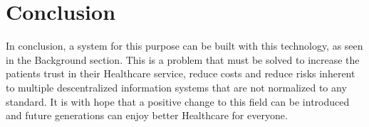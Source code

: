 \documentclass[notitlepage]{llncs}
\begin{document}

\section{Conclusion}
In conclusion, a system for this purpose can be built with this technology, as seen in the Background section. This is a problem that must be solved to increase the patients trust in their Healthcare service, reduce costs and reduce risks inherent to multiple descentralized information systems that are not normalized to any standard. It is with hope that a positive change to this field can be introduced and future generations can enjoy better Healthcare for everyone.
\newpage


\begingroup
\nocite{*}
\raggedright


\endgroup
\end{document}
